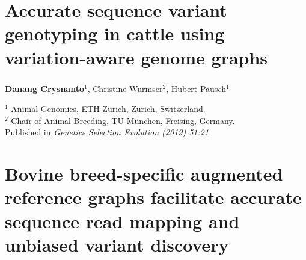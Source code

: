 \documentclass[11 pt, a4paper, notitlepage, twoside]{report}
\begin{document}
\bigskip



\iftwoside
\cleardoublepage
\newpage
\fi


\chapter[Genotyping From Variation-Aware Graphs]{\LARGE{Accurate sequence variant genotyping in cattle using variation-aware genome graphs}}
\label{chap:locgraph}

\subsection*{}
\onehalfspacing
\normalsize

{
\vspace{2em}
\setlength\parindent{0pt}
\large

\textbf{Danang Crysnanto}$^{1}$, Christine Wurmser$^{2}$, Hubert Pausch$^{1}$ \\

\vspace{0.5em}

$^1$ Animal Genomics, ETH Zurich, Zurich, Switzerland. \\
$^2$ Chair of Animal Breeding, TU München, Freising, Germany. \\

\bigskip
Published in \emph{Genetics Selection Evolution (2019) 51:21}

\bigskip

\begin{center}\end{center}

}




\iftwoside
\cleardoublepage
\newpage
\fi



\chapter[Unbiased Variant Analysis Using Genome Graphs]{\LARGE{Bovine breed-specific augmented reference graphs facilitate accurate sequence read mapping and unbiased variant discovery}}
\label{chap:wholegraph}
\end{document}
